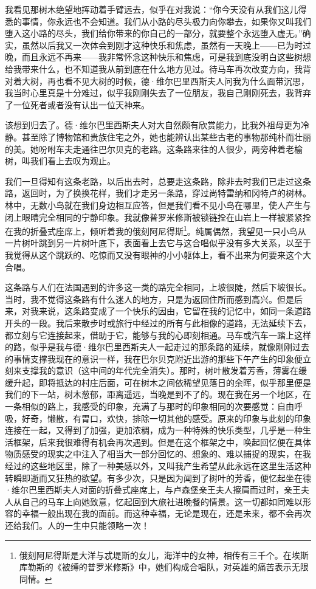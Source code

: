 \par 我看见那树木绝望地挥动着手臂远去，似乎在对我说：“你今天没有从我们这儿得悉的事情，你永远也不会知道。我们从小路的尽头极力向你攀去，如果你又叫我们堕入这小路的尽头，我们给你带来的你自己的一部分，就要整个永远堕入虚无。”确实，虽然以后我又一次体会到刚才这种快乐和焦虑，虽然有一天晚上——已为时过晚，而且永远不再来——我非常怀念这种快乐和焦虑，可是我到底没明白这些树想给我带来什么，也不知道我从前到底在什么地方见过。待马车再次改变方向，我背对着大树，再也看不见大树的时候，德·维尔巴里西斯夫人问我为什么面带沉思，我当时心里真是十分难过，似乎我刚刚失去了一位朋友，我自己刚刚死去，我背弃了一位死者或者没有认出一位天神来。
\par 该想到归去了。德·维尔巴里西斯夫人对大自然颇有欣赏能力，比我外祖母更为冷静。甚至除了博物馆和贵族住宅之外，她也能辨认出某些古老的事物那纯朴而壮丽的美。她吩咐车夫走通往巴尔贝克的老路。这条路来往的人很少，两旁种着老榆树，叫我们看上去叹为观止。
\par 我们一旦得知有这条老路，以后出去时，总要走这条路，除非去时我们已走过这条路，返回时，为了换换花样，我们才走另一条路，穿过尚特雷纳和冈特卢的树林。林中，无数小鸟就在我们身边相互应答，但是我们看不见小鸟在哪里，使人产生与闭上眼睛完全相同的宁静印象。我就像普罗米修斯被锁链拴在山岩上一样被紧紧拴在我的折叠式座席上，倾听着我的俄刻阿尼得斯\footnote{俄刻阿尼得斯是大洋与忒堤斯的女儿，海洋中的女神，相传有三千个。在埃斯库勒斯的《被缚的普罗米修斯》中，她们构成合唱队，对英雄的痛苦表示无限同情。}。纯属偶然，我望见一只小鸟从一片树叶跳到另一片树叶底下，表面看上去它与这合唱似乎没有多大关系，以至于我觉得从这个跳跃的、吃惊而又没有眼神的小小躯体上，看不出来为何要来这个大合唱。
\par 这条路与人们在法国遇到的许多这一类的路完全相同，上坡很陡，然后下坡很长。当时，我不觉得这条路有什么迷人的地方，只是为返回住所而感到高兴。但是后来，对我来说，这条路变成了一个快乐的因由，它留在我的记忆中，如同一条道路开头的一段。我后来散步时或旅行中经过的所有与此相像的道路，无法延续下去，都立刻与它连接起来，借助于它，能够与我的心即刻相通。马车或汽车一踏上这样的路，似乎是我与德·维尔巴里西斯夫人一起走过的那条路的延续，就像刚刚过去的事情支撑我现在的意识一样，我在巴尔贝克附近出游的那些下午产生的印象便立刻来支撑我的意识（这中间的年代完全消失）。那时，树叶散发着芳香，薄雾在缓缓升起，即将抵达的村庄后面，可在树木之间依稀望见落日的余晖，似乎那里便是我们的下一站，树木葱郁，距离遥远，当晚是到不了的。现在我在另一个地区，在一条相似的路上，我感受的印象，充满了与那时的印象相同的次要感觉：自由呼吸，好奇，懒散，有胃口，欢快，排除一切其他的感受。原来的印象与此刻的印象连接在一起，又得到了加强，更加浓稠，成为一种特殊的快乐类型，几乎是一种生活框架，后来我很难得有机会再次遇到。但是在这个框架之中，唤起回忆便在具体物质感受的现实之中注入了相当大一部分回忆的、想象的、难以捕捉的现实，在我经过的这些地区里，除了一种美感以外，又叫我产生希望从此永远在这里生活这种转瞬即逝而又狂热的欲望。有多少次，只是因为闻到了树叶的芳香，便忆起坐在德·维尔巴里西斯夫人对面的折叠式座席上，与卢森堡亲王夫人擦肩而过时，亲王夫人从自己的马车上向她致意，忆起回到大旅社进晚餐的情景。这一切都如同难以形容的幸福一般出现在我的面前。而这种幸福，无论是现在，还是未来，都不会再次还给我们。人的一生中只能领略一次！

